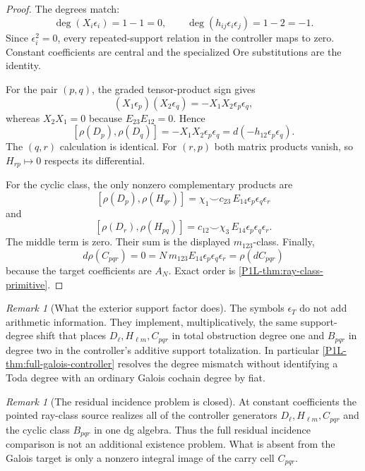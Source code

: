 \documentclass[11pt]{article}
\theoremstyle{remark}
\newtheorem{remark}[theorem]{Remark}
\begin{document}
\begin{proof}
The degrees match:
\[
 \deg(X_i\epsilon_i)=1-1=0,
 \qquad
 \deg(h_{ij}\epsilon_i\epsilon_j)=1-2=-1.
\]
Since $\epsilon_i^2=0$, every repeated-support relation in the controller maps to zero.  Constant coefficients are central and the specialized Ore substitutions are the identity.

For the pair $(p,q)$, the graded tensor-product sign gives
\[
 (X_1\epsilon_p)(X_2\epsilon_q)
 =-X_1X_2\epsilon_p\epsilon_q,
\]
whereas $X_2X_1=0$ because $E_{23}E_{12}=0$.  Hence
\[
 [\rho(D_p),\rho(D_q)]
 =-X_1X_2\epsilon_p\epsilon_q
 =d(-h_{12}\epsilon_p\epsilon_q).
\]
The $(q,r)$ calculation is identical.  For $(r,p)$ both matrix products vanish, so $H_{rp}\mapsto0$ respects its differential.

For the cyclic class, the only nonzero complementary products are
\[
 [\rho(D_p),\rho(H_{qr})]
 =\chi_1\smile c_{23}\,E_{14}\epsilon_p\epsilon_q\epsilon_r
\]
and
\[
 [\rho(D_r),\rho(H_{pq})]
 =c_{12}\smile\chi_3\,E_{14}\epsilon_p\epsilon_q\epsilon_r.
\]
The middle term is zero.  Their sum is the displayed $m_{123}$-class.  Finally,
\[
 d\rho(C_{pqr})=0
 =N\,m_{123}E_{14}\epsilon_p\epsilon_q\epsilon_r
 =\rho(dC_{pqr})
\]
because the target coefficients are $A_N$.  Exact order is \cref{P1L-thm:ray-class-primitive}.
\end{proof}

\begin{remark}[What the exterior support factor does]\label{P1L-rem:support-desuspension}
The symbols $\epsilon_T$ do not add arithmetic information.  They implement, multiplicatively, the same support-degree shift that places $D_\ell,H_{\ell m},C_{pqr}$ in total obstruction degree one and $B_{pqr}$ in degree two in the controller's additive support totalization.  In particular \cref{P1L-thm:full-galois-controller} resolves the degree mismatch without identifying a Toda degree with an ordinary Galois cochain degree by fiat.
\end{remark}

\begin{remark}[The residual incidence problem is closed]\label{P1L-rem:residual-incidence-closed}
At constant coefficients the pointed ray-class source realizes all of the controller generators $D_\ell,H_{\ell m},C_{pqr}$ and the cyclic class $B_{pqr}$ in one dg algebra.  Thus the full residual incidence comparison is not an additional existence problem.  What is absent from the Galois target is only a nonzero integral image of the carry cell $C_{pqr}$.
\end{remark}
\end{document}
